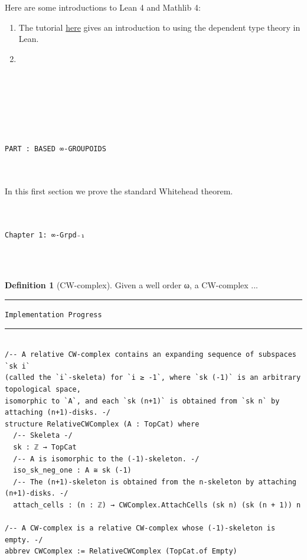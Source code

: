 \documentclass{book}
\theoremstyle{definition}
\newtheorem{definition}{Definition}
\newcounter{pcounter}
\newcounter{lcounter}
\renewcommand{\chapter}[1]{
\newpage
{
\Huge 
\begin{center}
\ \\
\ \\
\thispagestyle{empty}
\texttt{#1}
\end{center}}
\ \\
\ \\
}
\newcounter{partcount}
\renewcommand{\part}[1]{
\newpage
{
\Huge 
\begin{center}
\ \\
\ \\
\ \\
\ \\
\ \\
\ \\
\thispagestyle{empty}
\texttt{PART {\thepartcount}: #1}
\stepcounter{partcount}
\end{center}}
\ \\
\ \\
}
\begin{document}
Here are some introductions to Lean 4 and Mathlib 4:

\begin{enumerate}
\item The tutorial \href{https://leanprover.github.io/theorem_proving_in_lean4/}{here} gives an introduction to using the dependent type theory in Lean.
\item 
\end{enumerate}





\part{BASED ∞-GROUPOIDS}

In this first section we prove the standard Whitehead theorem.\\


\chapter{Chapter 1: ∞\texttt{-Grpd₋₁}}

\begin{definition}[CW-complex]
Given a well order ω, a CW-complex ...
\end{definition}



\noindent\textcolor{Red}{\rule{16cm}{1mm}}
\begin{center}
\texttt{Implementation Progress}
\end{center}
\noindent\textcolor{Red}{\rule{16cm}{1mm}}


\begin{center}
\begin{tcolorbox}[width=5in,colback={white},title={\begin{center}\texttt{Lean \thelcounter} \addtocounter{lcounter}{1}  \end{center}},colbacktitle=Blue,coltitle=black]
\begin{verbatim}

/-- A relative CW-complex contains an expanding sequence of subspaces `sk i`
(called the `i`-skeleta) for `i ≥ -1`, where `sk (-1)` is an arbitrary topological space,
isomorphic to `A`, and each `sk (n+1)` is obtained from `sk n` by attaching (n+1)-disks. -/
structure RelativeCWComplex (A : TopCat) where
  /-- Skeleta -/
  sk : ℤ → TopCat
  /-- A is isomorphic to the (-1)-skeleton. -/
  iso_sk_neg_one : A ≅ sk (-1)
  /-- The (n+1)-skeleton is obtained from the n-skeleton by attaching (n+1)-disks. -/
  attach_cells : (n : ℤ) → CWComplex.AttachCells (sk n) (sk (n + 1)) n

/-- A CW-complex is a relative CW-complex whose (-1)-skeleton is empty. -/
abbrev CWComplex := RelativeCWComplex (TopCat.of Empty)

\end{verbatim}
\end{tcolorbox}
\end{center}
\end{document}
